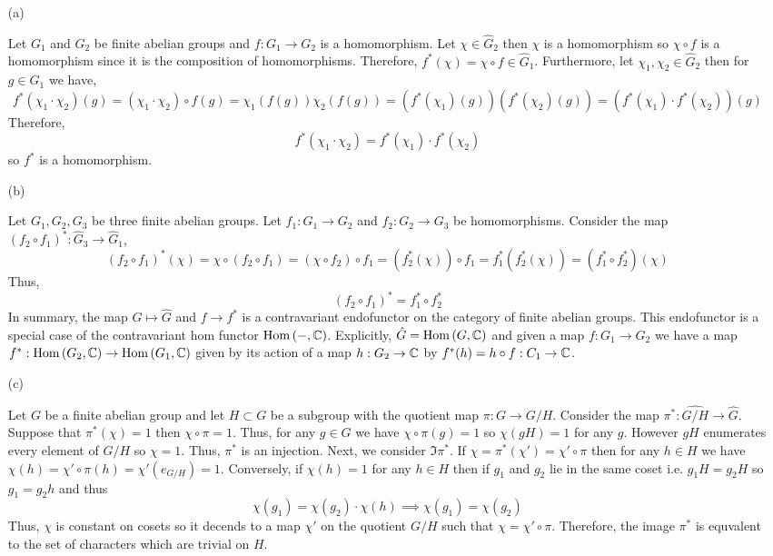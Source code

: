 \documentclass[12pt]{extarticle}
\begin{document}
\begin{enumerate}
\item[(a)]

Let $G_1$ and $G_2$ be finite abelian groups and $f : G_1 \to G_2$ is a homomorphism. Let $\chi \in \hat{G}_2$ then $\chi$ is a homomorphism so $\chi \circ f$ is a homomorphism since it is the composition of homomorphisms. Therefore, $f^*(\chi) = \chi \circ f \in \hat{G}_1$. Furthermore, let $\chi_1, \chi_2 \in \hat{G}_2$ then for $g \in G_1$ we have, 
\[f^*(\chi_1 \cdot \chi_2)(g) = (\chi_1 \cdot \chi_2) \circ f(g) = \chi_1(f(g)) \chi_2(f(g)) = (f^*(\chi_1)(g)) (f^*(\chi_2)(g)) = (f^*(\chi_1) \cdot f^*(\chi_2))(g) \] 
Therefore,
\[ f^*(\chi_1 \cdot \chi_2) = f^*(\chi_1) \cdot f^*(\chi_2) \]
so $f^*$ is a homomorphism.

\item[(b)]

Let $G_1, G_2, G_3$ be three finite abelian groups. Let $f_1 : G_1 \to G_2$ and $f_2 : G_2 \to G_3$ be homomorphisms. Consider the map $(f_2 \circ f_1)^* : \hat{G}_3 \to \hat{G}_1$,
\[ (f_2 \circ f_1)^*(\chi) = \chi \circ (f_2 \circ f_1) = (\chi \circ f_2) \circ f_1 = (f_2^* (\chi)) \circ f_1 = f_1^*(f_2^*(\chi)) = (f_1^* \circ f_2^*) (\chi)\]
Thus,
\[ (f_2 \circ f_1)^* = f_1^* \circ f_2^* \]
In summary, the map $G \mapsto \hat{G}$ and $f \to f^*$ is a contravariant endofunctor on the category of finite abelian groups. This endofunctor is a special case of the contravariant hom functor $\mathrm{Hom}\left( -, \mathbb{C} \right)$. Explicitly, $\hat{G} = \mathrm{Hom}\left( G, \mathbb{C} \right)$
and given a map $f : G_1 \to G_2$ we have a map $f^* : \mathrm{Hom}\left( G_2, \mathbb{C} \right) \to \mathrm{Hom}\left( G_1, \mathbb{C} \right)$ given by its action of a map $h : G_2 \to \mathbb{C}$ by $f^*(h) = h \circ f : C_1 \to \mathbb{C}$.     

\item[(c)]

Let $G$ be a finite abelian group and let $H \subset G$ be a subgroup with the quotient map $\pi : G \to G/H$. Consider the map $\pi^* : \widehat{G/H} \to \hat{G}$. Suppose that $\pi^*(\chi) = 1$ then $\chi \circ \pi = 1$. Thus, for any $g \in G$ we have $\chi \circ \pi(g) = 1$ so $\chi(g H) = 1$ for any $g$. However $g H$ enumerates every element of $G/H$ so $\chi = 1$. Thus, $\pi^*$ is an injection. Next, we consider $\Im{\pi^*}$. If $\chi = \pi^*(\chi') = \chi' \circ \pi$ then for any $h \in H$ we have $\chi(h) = \chi' \circ \pi(h) = \chi'(e_{G/H}) = 1$. Conversely, if $\chi(h) = 1$ for any $h \in H$ then if $g_1$ and $g_2$ lie in the same coset i.e. $g_1 H = g_2 H$ so $g_1 = g_2 h$ and thus 
\[\chi(g_1) = \chi(g_2) \cdot \chi(h) \implies \chi(g_1) = \chi(g_2) \]
Thus, $\chi$ is constant on cosets so it decends to a map $\chi'$ on the quotient $G/H$ such that $\chi = \chi' \circ \pi$. Therefore, the image $\pi^*$ is equvalent to the set of characters which are trivial on $H$. 


\end{enumerate}
\end{document}
